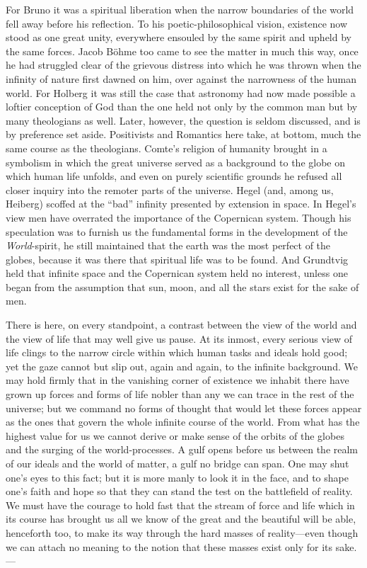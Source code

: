 \documentclass[12pt,a4paper]{article}
\newcommand{\opage}[1]{\marginnote{\footnotesize\textit{[#1]}}}
\begin{document}
For Bruno it was a spiritual liberation when the narrow boundaries of the world
fell away before his reflection. To his poetic-philosophical vision, existence now
stood as one great unity, everywhere ensouled by the same spirit and upheld by the
same forces. Jacob Böhme too came to see the matter in much this way, once he had
struggled clear of the grievous distress into which he was thrown when the
infinity of nature first dawned on him, over against the narrowness of the human
world. For Holberg it was still the case that astronomy had now made possible a
loftier conception of God than the one held not only by the common man but by many
theologians as well. Later, however, the question is seldom discussed, and is by
preference set aside. Positivists and Romantics here take, at bottom, much the same
course as the theologians. Comte's religion of humanity brought in a symbolism in
which the great universe \opage{12}served as a background to the globe on which human life
unfolds, and even on purely scientific grounds he refused all closer inquiry into
the remoter parts of the universe. Hegel (and, among us, Heiberg) scoffed at the
``bad'' infinity presented by extension in space. In Hegel's view men have
overrated the importance of the Copernican system. Though his speculation was to
furnish us the fundamental forms in the development of the \emph{World}-spirit, he
still maintained that the earth was the most perfect of the globes, because it was
there that spiritual life was to be found. And Grundtvig held that infinite space
and the Copernican system held no interest, unless one began from the assumption
that sun, moon, and all the stars exist for the sake of men.

There is here, on every standpoint, a contrast between the view of the world and
the view of life that may well give us pause. At its inmost, every serious view of
life clings to the narrow circle within which human tasks and ideals hold good;
yet the gaze cannot but slip out, again and again, to the infinite background. We
may hold firmly that in the vanishing corner of existence we inhabit there have
grown up forces and forms of life nobler than any we can trace in the rest of the
universe; but we command no forms of thought that would let these forces appear as
the ones that govern the whole infinite course of the world. From what has the
highest value for us we cannot derive or make sense of the orbits of the globes
and the surging of the world-processes. A gulf opens before us between the realm
of our ideals and the world of matter, a gulf no bridge can span. One may shut
one's eyes to this fact; but it is more manly to look it in the face, and to shape
one's faith and hope so that they can stand the test on the battlefield of reality.
We must have the courage to hold fast that the stream of force and life which in
its course has \opage{13}brought us all we know of the great and the beautiful will be able,
henceforth too, to make its way through the hard masses of reality---even though we
can attach no meaning to the notion that these masses exist only for its sake. ---
\end{document}
